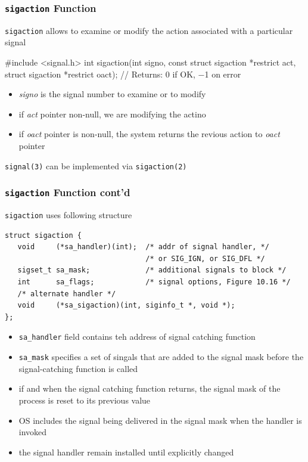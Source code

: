 \documentclass[newPxFont,sthlmFooter,nooffset]{beamer}
\begin{document}
\begin{frame}
  \frametitle{\texttt{sigaction} Function}
\texttt{sigaction} allows to examine or modify the action associated with a particular signal
\begin{codedef}
#include <signal.h>
int sigaction(int signo, const struct sigaction *restrict act,
              struct sigaction *restrict oact);
// Returns: 0 if OK, −1 on error  
\end{codedef}

\begin{itemize}
\item \textit{signo} is the signal number to examine or to modify
\item if \textit{act} pointer non-null, we are modifying the actino
\item if \textit{oact} pointer is non-null, the system returns the revious action to \textit{oact} pointer
\end{itemize}

\texttt{signal(3)} can be implemented via \texttt{sigaction(2)}
\end{frame}



\begin{frame}
  \frametitle{\texttt{sigaction} Function cont'd}
\texttt{sigaction} uses following structure
{\footnotesize
\begin{verbatim}
struct sigaction {
   void     (*sa_handler)(int);  /* addr of signal handler, */
                                 /* or SIG_IGN, or SIG_DFL */
   sigset_t sa_mask;             /* additional signals to block */
   int      sa_flags;            /* signal options, Figure 10.16 */
   /* alternate handler */
   void     (*sa_sigaction)(int, siginfo_t *, void *);
};
\end{verbatim}
}
{\footnotesize
\begin{itemize}
\item \texttt{sa\_handler} field contains teh address of signal catching function
\item \texttt{sa\_mask} specifies a set of singals that are added to the signal mask before the signal-catching function is called
\item if and when the signal catching function returns, the signal mask of the process is reset to its previous value
\item OS includes the signal being delivered in the signal mask when the handler is invoked
\item the signal handler remain installed until explicitly changed
\end{itemize}
}
\end{frame}
\end{document}
